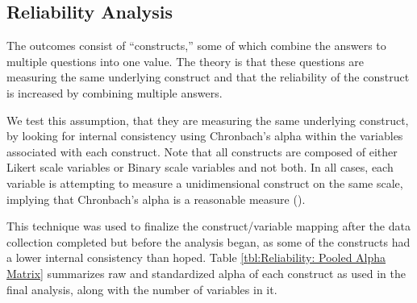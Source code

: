 \documentclass{article}
\begin{document}





\subsection*{Reliability Analysis}

The outcomes consist of ``constructs,'' some of which combine the answers to multiple questions into one value. The theory is that these questions are measuring the same underlying construct and that the reliability of the construct is increased by combining multiple answers.

We test this assumption, that they are measuring the same underlying construct, by looking for internal consistency using Chronbach's alpha within the variables associated with each construct. Note that all constructs are composed of either Likert scale variables or Binary scale variables and not both. In all cases, each variable is attempting to measure a unidimensional construct on the same scale, implying that Chronbach's alpha is a reasonable measure (\cite{Tavakol2011}).

This technique was used to finalize the construct/variable mapping after the data collection completed but before the analysis began, as some of the constructs had a lower internal consistency than hoped. Table \ref{tbl:Reliability: Pooled Alpha Matrix} summarizes raw and standardized alpha of each construct as used in the final analysis, along with the number of variables in it.
\end{document}

